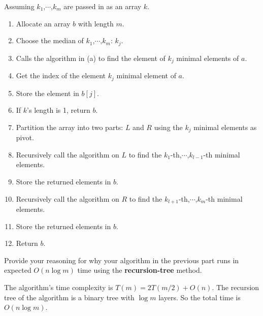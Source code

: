 \begin{parts}
\begin{subparts}
    \begin{solution}
      $ $\\
      Assuming $k_1$,$\cdots$,$k_{m}$ are passed in as an array $k$.
      \begin{enumerate}
        \item
              Allocate an array $b$ with length $m$.
        \item
              Choose the median of $k_1$,$\cdots$,$k_{m}$: $k_j$.
        \item
              Calls the algorithm in (a) to find the element of $k_j$ minimal elements of $a$.
        \item
              Get the index of the element $k_j$ minimal element of $a$.
        \item
              Store the element in $b[j]$.
        \item
              If $k$'s length is 1, return $b$.
        \item
              Partition the array into two parts: $L$ and $R$ using the $k_j$ minimal elements as pivot.
        \item
              Recursively call the algorithm on $L$ to find the $k_1$-th,$\cdots$,$k_{l-1}$-th minimal elements.
        \item
              Store the returned elements in $b$.
        \item
              Recursively call the algorithm on $R$ to find the $k_{l+1}$-th,$\cdots$,$k_{m}$-th minimal elements.
        \item
              Store the returned elements in $b$.
        \item
              Return $b$.
      \end{enumerate}
    \end{solution}

    \subpart[2] Provide your reasoning for why your algorithm in the previous part runs in expected $O(n\log m)$ time using the \textbf{recursion-tree} method.
    \begin{solution}
      $ $\\
      The algorithm's time complexity is $T(m) = 2T(m/2) + O(n)$.
      The recursion tree of the algorithm is a binary tree with $\log m$ layers. So the total time is $O(n\log m)$.
    \end{solution}

  \end{subparts}

\end{parts}
